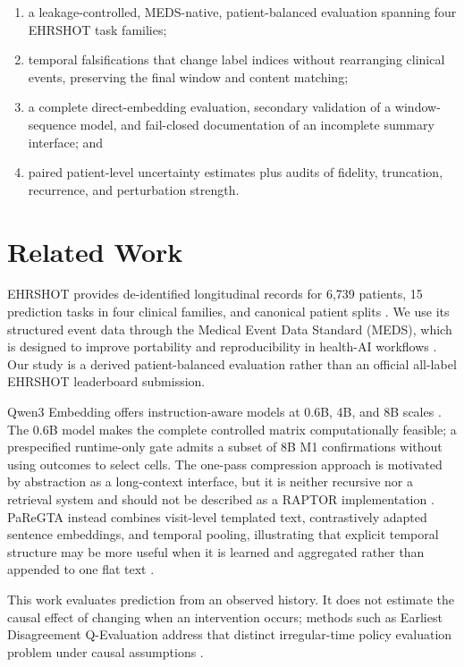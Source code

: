 \documentclass[pmlr,twocolumn,10pt]{jmlr}
\begin{document}
\begin{enumerate}
  \item a leakage-controlled, MEDS-native, patient-balanced evaluation spanning
  four EHRSHOT task families;
  \item temporal falsifications that change label indices without rearranging
  clinical events, preserving the final window and content matching;
  \item a complete direct-embedding evaluation, secondary validation of a
  window-sequence model, and fail-closed documentation of an incomplete
  summary interface; and
  \item paired patient-level uncertainty estimates plus audits of fidelity,
  truncation, recurrence, and perturbation strength.
\end{enumerate}

\section{Related Work}
\label{sec:related}

EHRSHOT provides de-identified longitudinal records for 6,739 patients, 15
prediction tasks in four clinical families, and canonical patient splits
\citep{wornow2023ehrshot}. We use its structured event data through the Medical
Event Data Standard (MEDS), which is designed to improve portability and
reproducibility in health-AI workflows \citep{mcdermott2026meds}. Our study is a
derived patient-balanced evaluation rather than an official all-label EHRSHOT
leaderboard submission.

Qwen3 Embedding offers instruction-aware models at 0.6B, 4B, and 8B scales
\citep{zhang2025qwen3embedding}. The 0.6B model makes the complete controlled
matrix computationally feasible; a prespecified runtime-only gate admits a
subset of 8B M1 confirmations without using outcomes to select cells. The
one-pass compression approach is motivated by abstraction as a long-context
interface, but it is neither recursive nor a retrieval system and should not be
described as a RAPTOR implementation \citep{sarthi2024raptor}. PaReGTA instead
combines visit-level templated text, contrastively adapted sentence embeddings,
and temporal pooling, illustrating that explicit temporal structure may be more
useful when it is learned and aggregated rather than appended to one flat text
\citep{yoon2026paregta}.

This work evaluates prediction from an observed history. It does not estimate
the causal effect of changing when an intervention occurs; methods such as
Earliest Disagreement Q-Evaluation address that distinct irregular-time policy
evaluation problem under causal assumptions \citep{wald2025time}.
\end{document}

